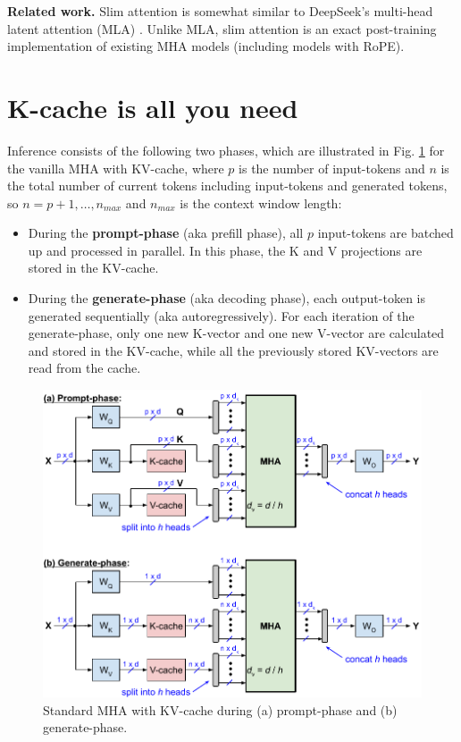 \documentclass{article}
\begin{document}
\textbf{Related work.} Slim attention is somewhat similar to DeepSeek’s multi-head latent attention (MLA) \citep{deepseek-v2}. Unlike MLA, slim attention is an exact post-training implementation of existing MHA models (including models with RoPE).

\section{K-cache is all you need}
Inference consists of the following two phases, which are illustrated in Fig. \ref{fig2} for the vanilla MHA with KV-cache, where $p$ is the number of input-tokens and $n$ is the total number of current tokens including input-tokens and generated tokens, so $n = p+1, \ldots, n_{max}$ and $n_{max}$ is the context window length:
\begin{itemize}[topsep=-1pt]
  \item During the \textbf{prompt-phase} (aka prefill phase), all $p$ input-tokens are batched up and processed in parallel. In this phase, the K and V projections are stored in the KV-cache.
  \item During the \textbf{generate-phase} (aka decoding phase), each output-token is generated sequentially (aka autoregressively). For each iteration of the generate-phase, only one new K-vector and one new V-vector are calculated and stored in the KV-cache, while all the previously stored KV-vectors are read from the cache.
\end{itemize}
\begin{figure}[h!] \centering
  \includegraphics[scale=0.71]{../doc/fig/slimAttn_fig2.pdf}
  \caption{Standard MHA with KV-cache during (a) prompt-phase and (b) generate-phase.}
\label{fig2} \end{figure}
\end{document}
